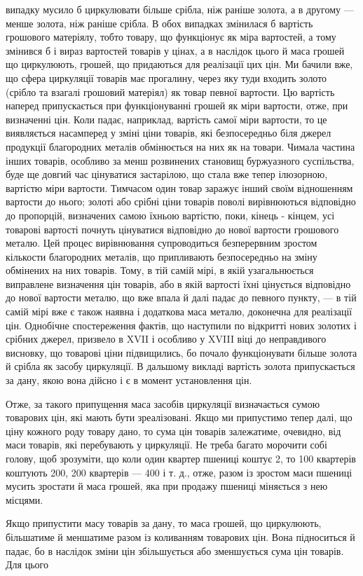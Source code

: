 \parcont{}  %
випадку мусило б циркулювати більше срібла, ніж раніше золота,
а в другому — менше золота, ніж раніше срібла. В обох випадках
змінилася б вартість грошового матеріялу, тобто товару,
що функціонує як міра вартостей, а тому змінився б і вираз
вартостей товарів у цінах, а в наслідок цього й маса грошей
що циркулюють, грошей, що придаються для реалізації цих
цін. Ми бачили вже, що сфера циркуляції товарів має прогалину,
через яку туди входить золото (срібло та взагалі грошовий
матеріял) як товар певної вартости. Цю вартість наперед припускається
при функціонуванні грошей як міри вартости, отже,
при визначенні цін. Коли падає, наприклад, вартість самої міри
вартости, то це виявляється насамперед у зміні ціни товарів,
які безпосередньо біля джерел продукції благородних металів
обмінюється на них як на товари. Чимала частина інших товарів,
особливо за менш розвинених становищ буржуазного суспільства,
буде ще довгий час цінуватися застарілою, що стала вже тепер
ілюзорною, вартістю міри вартости. Тимчасом один товар заражує
інший своїм відношенням вартости до нього; золоті або
срібні ціни товарів поволі вирівнюються відповідно до пропорцій,
визначених самою їхньою вартістю, поки, кінець - кінцем, усі
товарові вартості почнуть цінуватися відповідно до нової вартости
грошового металю. Цей процес вирівнювання супроводиться
безперервним зростом кількости благородних металів, що припливають
безпосередньо на зміну обмінених на них товарів.
Тому, в тій самій мірі, в якій узагальнюється виправлене визначення
цін товарів, або в якій вартості їхні цінується відповідно
до нової вартости металю, що вже впала й далі падає до певного
пункту, — в тій самій мірі вже є також наявна і додаткова
маса металю, доконечна для реалізації цін. Однобічне спостереження
фактів, що наступили по відкритті нових золотих і срібних
джерел, призвело в XVII і особливо у XVIII віці до неправдивого
висновку, що товарові ціни підвищились, бо почало функціонувати
більше золота й срібла як засобу циркуляції. В дальшому
викладі вартість золота припускається за дану, якою вона
дійсно і є в момент установлення цін.

Отже, за такого припущення маса засобів циркуляції визначається
сумою товарових цін, які мають бути зреалізовані. Якщо
ми припустимо тепер далі, що ціну кожного роду товару дано,
то сума цін товарів залежатиме, очевидно, від маси товарів,
які перебувають у циркуляції. Не треба багато морочити собі
голову, щоб зрозуміти, що коли один квартер пшениці коштує
2, то 100 квартерів коштують 200,
200 квартерів — 400 і т. д., отже, разом
із зростом маси пшениці мусить зростати й маса грошей, яка
при продажу пшениці міняється з нею місцями.

Якщо припустити масу товарів за дану, то маса грошей, що
циркулюють, більшатиме й меншатиме разом із коливанням
товарових цін. Вона підноситься й падає, бо в наслідок зміни
цін збільшується або зменшується сума цін товарів. Для цього
\parbreak{}  %
